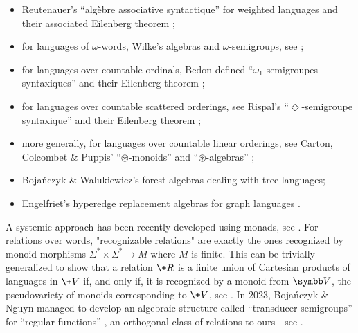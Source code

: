 \begin{itemize}
	\item Reutenauer's ``algèbre associative syntactique'' for weighted languages
		\cite[Théorème I.2.1, p.~451]{Reutenauer1980SeriesFormelles} and their associated Eilenberg theorem \cite[Théorème III.1.1, p.~469]{Reutenauer1980SeriesFormelles};
	\item for languages of $\omega$-words, Wilke's algebras and $\omega$-semigroups,
		see \cite[\S II, pp.~75--131 \& \S VI, pp.~265--306]{Perrin2004InfiniteWords};
	\item for languages over countable ordinals, Bedon defined ``$\omega_1$-semi\-groupes syntaxiques'' \cite[\S3, pp.~49--109]{bedon_langages_1998} and their Eilenberg theorem
		\cite[Theorem 22, p.~62]{bedon_eilenberg_1998};
	\item for languages over countable scattered orderings, see Rispal's ``$\Diamond$-semigroupe syntaxique'' \cite[\S 4.4, pp.~82--86]{rispal_automates_2004} and their Eilenberg theorem
		\cite[Theorem 6, p.~144]{bedon_schutzenberger_2005};
	\item more generally, for languages over countable linear orderings, see Carton, Colcombet \& Puppis' ``$\circledast$-monoids'' and ``$\circledast$-algebras''
		\cite[\S 3, p.~7]{carton_algebraic_2018};
	\item Bojańczyk \& Walukiewicz's 
		forest algebras \cite[\S 1.3, p.~4]{bojanczyk_forest_2008} \cite[\S 5, p.~159]{Bojanczyk2020MSO}
		dealing with tree languages;
	\item Engelfriet's hyperedge replacement algebras for graph languages
		\cite[\S 2.3, p.~100]{courcelle_graph_2012} \cite[\S 6.2, p.~194]{bojanczyk_recognisable_2015}.
\end{itemize}

A systemic approach has been recently developed using monads, see .
For relations over words, "recognizable 
relations" are exactly the ones recognized by monoid morphisms $\Sigma^* \times \Sigma^* \to M$ 
where $M$ is finite. This can be trivially generalized to show 
that a relation $\+R$ is a finite union of Cartesian products of languages in $\+V$ if, and only 
if, it is recognized by a monoid from $\B{V}$, the pseudovariety of monoids corresponding to
$\+V$, see .
In 2023, Bojańczyk \& Nguyn 
managed to develop an algebraic structure called ``transducer semigroups'' for ``regular functions'' \cite[Theorem 3.2, p.~6]{bojanczyk_algebraic_2023}, an 
orthogonal class of relations to ours---see .


